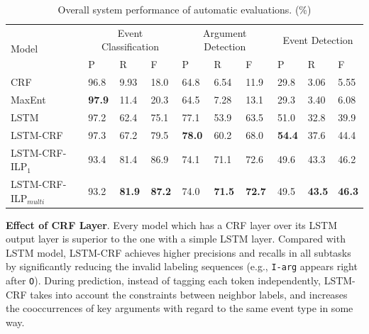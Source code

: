 \documentclass{article}
\begin{document}
\begin{table}[!t]
\centering
\small
\begin{tabular}{|l|p{0.8cm}<{\centering}|p{0.8cm}<{\centering}|p{0.8cm}<{\centering}|p{0.8cm}<{\centering}|p{0.8cm}<{\centering}|p{0.8cm}<{\centering}|p{0.8cm}<{\centering}|p{0.8cm}<{\centering}|p{0.8cm}<{\centering}|} \hline
	\multirow{2}{*}{Model} & \multicolumn{3}{c|}{Event Classification} & \multicolumn{3}{c|}{Argument Detection} & 
	\multicolumn{3}{c|}{Event Detection} \\ \cline{2-10}
	 & P & R & F & P & R & F & P & R & F \\ \hline
	CRF & 96.8 & 9.93 & 18.0 & 64.8 & 6.54 & 11.9 & 29.8 & 3.06 & 5.55 \\ \hline
	MaxEnt & \textbf{97.9} & 11.4 & 20.3 & 64.5 & 7.28 & 13.1 & 29.3 & 3.40 & 6.08 \\ \hline
	LSTM & 97.2 & 62.4 & 75.1 & 77.1 & 53.9 & 63.5 & 51.0 & 32.8 & 39.9  \\ \hline \hline
	LSTM-CRF & 97.3 & 67.2 & 79.5 & \textbf{78.0} & 60.2 & 68.0  & \textbf{54.4} & 37.6 & 44.4  \\ \hline
	LSTM-CRF-ILP$_{1}$ & 93.4 & 81.4 & 86.9 & 74.1 & 71.1 & 72.6  & 49.6 & 43.3 & 46.2 \\ \hline
	LSTM-CRF-ILP$_{multi}$ & 93.2 & \textbf{81.9} & \textbf{87.2} &  74.0 & \textbf{71.5} & \textbf{72.7} & 49.5 & \textbf{43.5} & \textbf{46.3} \\ \hline
\end{tabular}
\caption{Overall system performance of automatic evaluations. (\%) \label{tab:1}}
\end{table}

\vspace{1em}
\noindent \textbf{Effect of CRF Layer}. Every model which has a CRF layer over its LSTM output layer is superior to the one with a simple LSTM layer. Compared with LSTM model, LSTM-CRF achieves higher precisions and recalls in all subtasks by significantly reducing the invalid labeling sequences (e.g., \texttt{I-arg} appears right after \texttt{O}). During prediction, instead of tagging each token independently, LSTM-CRF takes into account the constraints between neighbor labels, and increases the cooccurrences of key arguments with regard to the same event type in some way.
\end{document}
